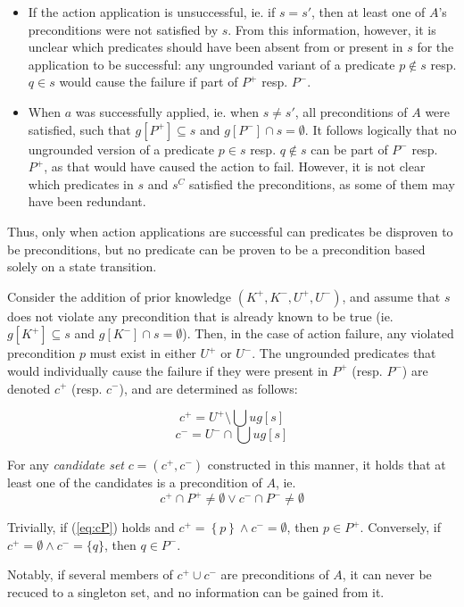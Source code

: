 \documentclass[../Master.tex]{subfiles}
\begin{document}
\begin{itemize}
    \item If the action
    application is unsuccessful, ie. if $s=s'$, then at least one of $A$'s
    preconditions were not satisfied by $s$. From this information, however, it
    is unclear which predicates should have been absent from or present in $s$
    for the application to be successful: any ungrounded variant of a predicate
    $p\notin s$ resp. $q\in s$ would cause the failure if part of $P^{+}$ resp.
    $P^{-}$.

    \item When $a$ was successfully applied, ie. when $s\neq s'$, all
    preconditions of $A$ were satisfied, such that $g\left[P^{+}\right]\subseteq
    s$ and $g\left[P^{-}\right]\cap s=\emptyset$. It follows logically that no
    ungrounded version of a predicate $p\in s$ resp. $q\notin s$ can be part of
    $P^{-}$ resp. $P^{+}$, as that would have caused the action to fail.
    However, it is not clear which predicates in $s$ and $s^{C}$ satisfied the
    preconditions, as some of them may have been redundant.
\end{itemize}
Thus,     only when action applications are successful can predicates be
disproven to     be preconditions, but no predicate can be proven to be a
precondition based     solely on a state transition.

Consider the addition of prior knowledge $\left(K^{+},K^{-},U^{+},U^{-}\right)$,
and assume that $s$ does not violate any precondition that is already known to
be true (ie. $g\left[K^{+}\right]\subseteq s$ and $g\left[K^{-}\right]\cap
s=\emptyset$). Then, in the case of action failure, any violated precondition
$p$ must exist in either $U^{+}$ or $U^{-}$. The ungrounded predicates that
would individually cause the failure if they were present in $P^{+}$ (resp.
$P^{-}$) are denoted $c^{+}$ (resp. $c^{-}$), and are determined as follows:

\[ c^{+}=U^{+}\setminus\bigcup ug\left[s\right] \] \[ c^{-}=U^{-}\cap\bigcup
ug\left[s\right] \]

For any \emph{candidate set} $c=\left(c^{+},c^{-}\right)$ constructed in this
manner, it holds that at least one of the candidates is a precondition of $A$,
ie. \begin{equation} c^{+}\cap P^{+}\neq\emptyset\lor c^{-}\cap
P^{-}\neq\emptyset\label{eq:cP} \end{equation}

\begin{cor} \label{candThe}Trivially, if (\ref{eq:cP}) holds and $c^{+}=\left\{
p\right\} \land c^{-}=\emptyset$, then $p\in P^{+}$. Conversely, if
$c^{+}=\emptyset\land c^{-}=\{q\}$, then $q\in P^{-}$. \end{cor} Notably, if
several members of $c^{+}\cup c^{-}$ are preconditions of $A$, it can never be
recuced to a singleton set, and no information can be gained from it.
\end{document}
